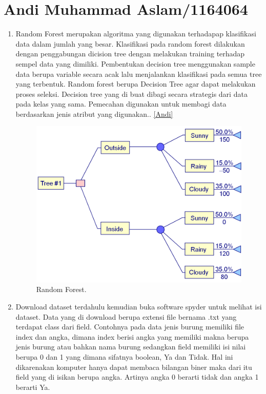 \section{Andi Muhammad Aslam/1164064}

\begin{enumerate}

\item Random Forest merupakan algoritma yang digunakan terhadapap klasifikasi data dalam jumlah yang besar. Klasifikasi pada random forest dilakukan dengan penggabungan dicision tree dengan melakukan training terhadap sempel data yang dimiliki. Pembentukan decision tree menggunakan sample data berupa variable secara acak lalu menjalankan klasifikasi pada semua tree yang terbentuk. Random forest berupa Decision Tree agar dapat melakukan proses seleksi. Decision tree yang di buat dibagi secara strategis dari data pada kelas yang sama. Pemecahan digunakan untuk membagi data berdasarkan jenis atribut yang digunakan..  \ref{Andi}

\begin{figure}[ht]
	\centerline{\includegraphics[width=1\textwidth]{figures/andi/decision tree.jpg}}
	\caption{Random Forest.}
	\label{contoh}
	\end{figure}

\item Download dataset terdahulu kemudian buka software spyder untuk melihat isi dataset. Data yang di download berupa extensi file bernama .txt yang terdapat class dari field. Contohnya pada data jenis burung memiliki file index dan angka, dimana index berisi angka yang memiliki makna berupa jenis burung atau bahkan nama burung sedangkan field memiliki isi nilai berupa 0 dan 1 yang dimana sifatnya boolean, Ya dan Tidak. Hal ini dikarenakan komputer hanya dapat membaca bilangan biner maka dari itu field yang di isikan berupa angka. Artinya angka 0 berarti tidak dan angka 1 berarti Ya.


\end{enumerate}

